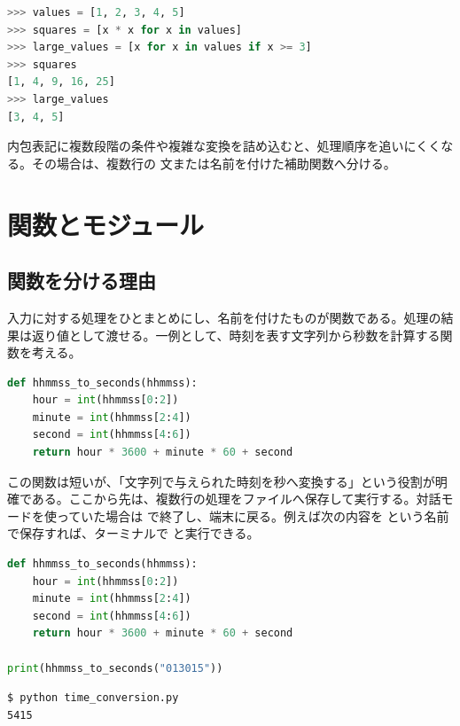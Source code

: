 \begin{lstlisting}[language=Python, numbers=none, xleftmargin=2\zw]
>>> values = [1, 2, 3, 4, 5]
>>> squares = [x * x for x in values]
>>> large_values = [x for x in values if x >= 3]
>>> squares
[1, 4, 9, 16, 25]
>>> large_values
[3, 4, 5]
\end{lstlisting}

内包表記に複数段階の条件や複雑な変換を詰め込むと、処理順序を追いにくくなる。その場合は、複数行の  文または名前を付けた補助関数へ分ける。

\section{関数とモジュール}

\subsection{関数を分ける理由}

入力に対する処理をひとまとめにし、名前を付けたものが関数である。処理の結果は返り値として渡せる。一例として、時刻を表す文字列から秒数を計算する関数を考える。

\begin{lstlisting}[language=Python]
def hhmmss_to_seconds(hhmmss):
    hour = int(hhmmss[0:2])
    minute = int(hhmmss[2:4])
    second = int(hhmmss[4:6])
    return hour * 3600 + minute * 60 + second
\end{lstlisting}

この関数は短いが、「文字列で与えられた時刻を秒へ変換する」という役割が明確である。ここから先は、複数行の処理をファイルへ保存して実行する。対話モードを使っていた場合は  で終了し、端末に戻る。例えば次の内容を  という名前で保存すれば、ターミナルで  と実行できる。

\begin{lstlisting}[language=Python, title=time\_conversion.py]
def hhmmss_to_seconds(hhmmss):
    hour = int(hhmmss[0:2])
    minute = int(hhmmss[2:4])
    second = int(hhmmss[4:6])
    return hour * 3600 + minute * 60 + second

print(hhmmss_to_seconds("013015"))
\end{lstlisting}

\begin{lstlisting}[numbers=none, xleftmargin=2\zw]
$ python time_conversion.py
5415
\end{lstlisting}

